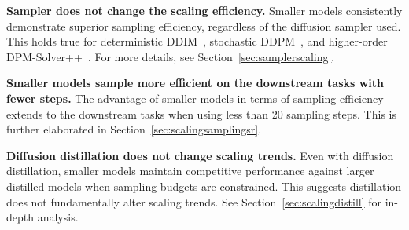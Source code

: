 \noindent \textbf{Sampler does not change the scaling efficiency.}
Smaller models consistently demonstrate superior sampling efficiency, regardless of the diffusion sampler used. This holds true for deterministic DDIM~\cite{song2020denoising}, stochastic DDPM~\cite{ho2020denoising}, and higher-order DPM-Solver++~\cite{lu2022dpm2}. For more details, see Section~\ref{sec:samplerscaling}.


\noindent \textbf{Smaller models sample more efficient on the downstream tasks with fewer steps.}
The advantage of smaller models in terms of sampling efficiency extends to the downstream tasks when using less than 20 sampling steps.
This is further elaborated in Section~\ref{sec:scalingsamplingsr}.

\noindent \textbf{Diffusion distillation does not change scaling trends.}
Even with diffusion distillation, smaller models maintain competitive performance against larger distilled models when sampling budgets are constrained. This suggests distillation does not fundamentally alter scaling trends. See Section~\ref{sec:scalingdistill} for in-depth analysis.


